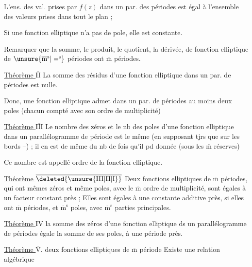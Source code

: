 L'ens. des val. prises par $f(z)$ dans un par. des périodes est égal à l'ensemble des valeurs prises dans tout le plan ;

\margin{$\times$}Si une fonction elliptique n'a pas de pole, elle est constante.

Remarquer que la somme, le produit, le quotient, la dérivée, de fonction elliptique de $\unsure{\overline{\mathrm m}^{\mathrm s}|=^{\mathrm s}}$ périodes ont $\overline{\mathrm m}$ périodes.

\margin{$\uparrow$}\uline{Théorème $\overline{\mathrm{II}}$} La somme des résidus d'une fonction elliptique dans un par. de périodes est nulle.

Donc, une fonction elliptique admet dans un par. de périodes au moins deux poles (chacun compté avec son ordre de multiplicité)

\uline{Théorème $\overline{\mathrm{III}}$} Le nombre des zéros et le nb des poles d'une fonction elliptique dans un parallélogramme de période est le même (en supposant tjrs que sur les bords --) ; il en est de même du nb de fois qu'il pd   donnée (sous les $\overline{\mathrm m}$ réserves)

Ce nombre est appellé ordre de la fonction elliptique.

\margin{$\downarrow$}\uline{Théorème $\overline{\deleted{\unsure{\mathrm{III}|\mathrm{II}|\mathrm I}}}$} Deux fonctions elliptiques de $\overline{\mathrm m}$ périodes, qui ont mêmes zéros et même poles, avec le $\overline{\mathrm m}$ ordre de multiplicité, sont égales à un facteur constant près ; Elles sont égales à une constante additive près, si elles ont $\overline{\mathrm m}$ périodes, et $\overline{\mathrm m}^{\mathrm s}$ poles, avec $\overline{\mathrm m}^{\mathrm s}$ parties principales.

\uline{Théorème $\overline{\mathrm{IV}}$} la somme des zéros d'une fonction  elliptique ds un parallélogramme de périodes égale la somme de ses poles, à une période près.

\uline{Théorème $\overline{\mathrm V}$}.  deux fonctions elliptiques de $\overline{\mathrm m}$ période Existe une relation algébrique

